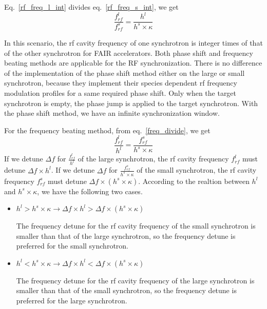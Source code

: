 Eq.~\ref{rf_freq_l_int} divides eq.~\ref{rf_freq_s_int}, we get
\begin{equation}
\frac{f_{rf}^{l}}{f_{rf}^{s}}= \frac{h^l}{h^s \times \kappa} \label{freq_divide}
\end{equation}


In this scenario, the rf cavity frequency of one synchrotron is integer times of that of the other synchrotron for FAIR accelerators. Both phase shift and frequency beating methods are applicable for the RF synchronization. There is no difference of the implementation of the phase shift method either on the large or small synchrotron, because they implement their species dependent rf frequency modulation profiles for a same required phase shift. Only when the target synchrotron is empty, the phase jump is applied to the target synchrotron. With the phase shift method, we have an infinite synchronization window. 

For the frequency beating method, from eq.~\ref{freq_divide}, we get
\begin{equation}
\frac{f_{rf}^{l}}{h^l}= \frac{f_{rf}^{s}}{h^s \times \kappa} 
\end{equation}
If we detune $\Delta f$ for $\frac{f_{rf}^{l}}{h^l}$ of the large synchrotron, the rf cavity frequency $ f_{rf}^{l}$ must detune $\Delta f \times h^l$. If we detune $\Delta f$ for $\frac{f_{rf}^{s}}{h^s \times \kappa}$ of the small synchrotron, the rf cavity frequency $ f_{rf}^{s}$ must detune $\Delta f \times (h^s \times \kappa)$. According to the realtion between $h^l$ and $h^s \times \kappa$, we have the following two cases.
\begin{itemize}
	\item $h^l > h^s \times \kappa \rightarrow \Delta f \times h^l > \Delta f \times (h^s \times \kappa)$ 

The frequency detune for the rf cavity frequency of the small synchrotron is smaller than that of the large synchrotron, so the frequency detune is preferred for the small synchrotron.
	\item $h^l < h^s \times \kappa \rightarrow \Delta f \times h^l < \Delta f \times (h^s \times \kappa)$

The frequency detune for the rf cavity frequency of the large synchrotron is smaller than that of the small synchrotron, so the frequency detune is preferred for the large synchrotron.
\end{itemize}

